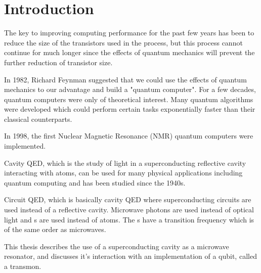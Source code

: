 
\chapter{Introduction} %

\label{Chapter1} %

The key to improving computing performance for the past few years has been to reduce the size of the transistors used in the process, but this process cannot continue for much longer since the effects of quantum mechanics will prevent the further reduction of transistor size.

In 1982, Richard Feynman suggested that we could use the effects of quantum mechanics to our advantage and build a "quantum computer". For a few decades, quantum computers were only of theoretical interest. Many quantum algorithms were developed which could perform  certain tasks exponentially faster than their classical counterparts.

In 1998, the first Nuclear Magnetic Resonance (NMR) quantum computers were implemented.

Cavity QED, which is the study of light in a superconducting reflective cavity interacting with atoms, can be used for many physical applications including quantum computing and has been studied since the 1940s.

Circuit QED, which is basically cavity QED where superconducting circuits are used instead of a reflective cavity. Microwave photons are used instead of optical light and {\JJ}s are used instead of atoms. The {\JJ}s have a transition frequency which is of the same order as microwaves.

This thesis describes the use of a superconducting cavity as a microwave resonator, and discusses it's interaction with  an implementation of a qubit, called a transmon.